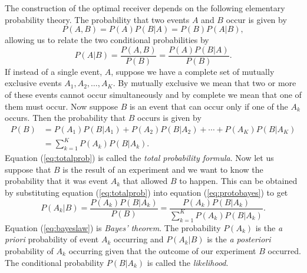 The construction of the optimal receiver depends on the following elementary
probability theory. The probability that two events $A$ and $B$ occur
is given by
\begin{equation}
P(A,B) = P(A) P(B|A) = P(B) P(A|B),
\label{eq:probproduct}
\end{equation}
allowing us to relate the two conditional probabilities by
\begin{equation}
P(A|B) = \frac{P(A,B)}{P(B)} = \frac{P(A)P(B|A)}{P(B)}.
\label{eq:protobayes}
\end{equation}
If instead of a single event, $A$, suppose we have a complete set of mutually
exclusive events $A_1, A_2, \ldots, A_K$. By mutually exclusive we mean that
two or more of these events cannot occur simultaneously and by complete we
mean that one of them must occur. Now suppose $B$ is an event that
can occur only if one of the $A_k$ occurs. Then the probability that $B$
occurs is given by
\begin{equation}
\begin{split}
P(B) &= P(A_1)P(B|A_1) + P(A_2)P(B|A_2) + \cdots + P(A_K)P(B|A_K) \\
     &= \sum_{k=1}^K P(A_k)P(B|A_k).
\end{split}
\label{eq:totalprob}
\end{equation}
Equation (\ref{eq:totalprob}) is called the \emph{total probability formula}.
Now let us suppose that $B$ is the result of an experiment and we want to know
the probability that it was event $A_k$ that allowed $B$ to happen. This can
be obtained by substituting equation (\ref{eq:totalprob}) into equation
(\ref{eq:protobayes}) to get
\begin{equation}
P(A_k|B) = \frac{P(A_k)P(B|A_k)}{P(B)} 
= \frac{P(A_k)P(B|A_k)}{\sum_{k=1}^K P(A_k)P(B|A_k)}.
\label{eq:bayeslaw}
\end{equation}
Equation (\ref{eq:bayeslaw}) is \emph{Bayes' theorem}. The probability
$P(A_k)$ is the \emph{a priori} probability of event $A_k$ occurring and
$P(A_k|B)$ is the \emph{a posteriori} probability of $A_k$ occurring given
that the outcome of our experiment $B$ occurred. The conditional probability
$P(B|A_k)$ is called the \emph{likelihood}.

